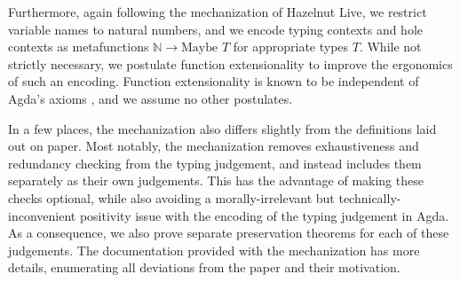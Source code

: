 Furthermore, again following the mechanization of Hazelnut Live, we restrict variable names to natural numbers, and we encode typing contexts and hole contexts as metafunctions $\mathbb{N} \to \text{Maybe } T$ for appropriate types $T$. While not strictly necessary, we postulate function extensionality to improve the ergonomics of such an encoding. Function extensionality is known to be independent of Agda’s axioms , and we assume no other postulates.

In a few places, the mechanization also differs slightly from the definitions laid out on paper. Most notably, the mechanization removes exhaustiveness and redundancy checking from the typing judgement, and instead includes them separately as their own judgements. This has the advantage of making these checks optional, while also avoiding a morally-irrelevant but technically-inconvenient positivity issue with the encoding of the typing judgement in Agda. As a consequence, we also prove separate preservation theorems for each of these judgements. The documentation provided with the mechanization has more details, enumerating all deviations from the paper and their motivation.